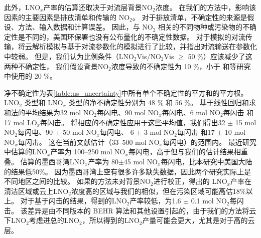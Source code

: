 此外，LNO$_x$产率的估算还取决于对流层背景NO$_2$浓度。
在我们的方法中，影响该因素的主要因素是排放清单和传输的 NO$_2$。
对于排放清单，不确定性的来源是假设、方法、输入数据和计算误差。
因此，与 NO$_2$ 相关的不同物种或污染物的不确定性是不同的，美国环保署也没有公布量化的不确定性数据。
对于模拟的对流传输，\citet{Li.2018}将云解析模拟与基于对流参数化的模拟进行了比较，并指出对流输送在参数化中较弱。
但是，我们认为比例条件（LNO$_2$Vis/NO$_2$Vis $\geq$ 50 \%）应该减少了这两种不确定性，
我们假设背景NO$_2$浓度导致的不确定性为 10 \%，小于 \citet{Allen.2019}和\citet{Bucsela.2019}等研究中使用的 20 \%。

净不确定性为表\ref{table:us_uncertainty}中所有单个不确定性的平方和的平方根。
LNO$_2$ 类型和 LNO$_x$ 类型的净不确定性分别为 48 \% 和 56 \%。
基于线性回归和求和法的平均结果为32 mol NO$_2$每闪电、90 mol NO$_x$每闪电、6 mol NO$_2$每闪击 和 17 mol LO$_x$每闪击。
将相应的不确定性应用于这些平均值，我们得出32 $\pm$ 15 mol NO$_2$每闪电、90 $\pm$ 50 mol NO$_x$每闪电、
6 $\pm$ 3 mol NO$_2$每闪击 和17 $\pm$ 10 mol NO$_x$每闪击。
这在当前文献估计（33--500 mol NO$_x$每闪电）的范围内\citep{Schumann.2007,Beirle.2010,Bucsela.2010}。
最近\citet{Bucsela.2010}研究中估算的LNO$_x$产率为 100--250 mol NO$_x$每闪电，高于但与我们的估计结果相重叠。
\citet{Pickering.2016}估算的墨西哥湾LNO$_x$产率为 80$\pm$45 mol NO$_x$每闪电，比本研究中美国大陆的结果低50\%。
因为墨西哥湾上空有很多许多缺失数据，因此两个研究实际上是不同地区之间的比较。
如果\citet{Pickering.2016}的方法未对背景NO$_2$进行校正，得出的 LNO$_x$产率在清洁区域或云上LNO$_2$浓度高的区域与我们的相似，但在污染区域可能高估18\%以上。
对于基于闪击的结果，\citet{Lapierre.2020}得到的LNO$_2$产率较低，为1.6 $\pm$ 0.1 mol NO$_2$每闪击。
该差异是由不同版本的 BEHR 算法和其他设置引起的，由于我们的方法将云下LNO$_2$考虑进总的LNO$_2$，所以得到的LNO$_2$产量可能会更大，尤其是对于高的云层。



